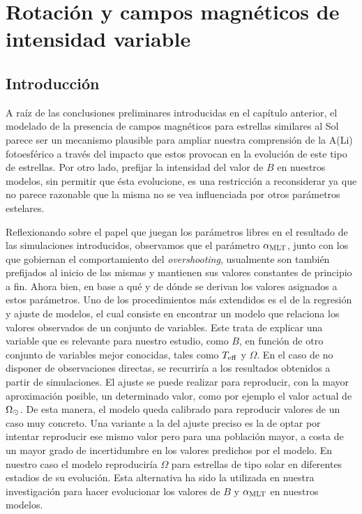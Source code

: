 

\chapter{Rotación y campos magnéticos de intensidad variable}\label{ch:septimo-capitulo}
\section{Introducción}
A raíz de las conclusiones preliminares introducidas en el capítulo anterior, el modelado de la presencia de campos magnéticos para estrellas similares al Sol parece ser un mecanismo plausible para ampliar nuestra comprensión de la A(Li) fotoesférico a través del impacto que estos provocan en la evolución de este tipo de estrellas. Por otro lado, prefijar la intensidad del valor de $B$ en nuestros modelos, sin permitir que ésta evolucione, es una restricción a reconsiderar ya que no parece razonable que la misma no se vea influenciada por otros parámetros estelares.\par

Reflexionando sobre el papel que juegan los parámetros libres en el resultado de las simulaciones introducidos, observamos que el parámetro $\alpha_{\mathrm{MLT}}$, junto con los que gobiernan el comportamiento del \textit{overshooting}, usualmente son también prefijados al inicio de las mismas y mantienen sus valores constantes de principio a fin. Ahora bien, en base a qué y de dónde se derivan los valores asignados a estos parámetros. Uno de los procedimientos más extendidos es el de la regresión y ajuste de modelos, el cual consiste en encontrar un modelo que relaciona los valores observados de un conjunto de variables. Este trata de explicar una variable que es relevante para nuestro estudio, como $B$, en función de otro conjunto de variables mejor conocidas, tales como $T_{\mathrm{eff}}$ y $\Omega$. En el caso de no disponer de observaciones directas, se recurriría a los resultados obtenidos a partir de simulaciones. El ajuste se puede realizar para reproducir, con la mayor aproximación posible, un determinado valor, como por ejemplo el valor actual de $\Omega_\odot$. De esta manera, el modelo queda calibrado para reproducir valores de un caso muy concreto. Una variante a la del ajuste preciso es la de optar por intentar reproducir ese mismo valor pero para una población mayor, a costa de un mayor grado de incertidumbre en los valores predichos por el modelo. En nuestro caso el modelo reproduciría $\Omega$ para estrellas de tipo solar en diferentes estadios de su evolución. Esta alternativa ha sido la utilizada en nuestra investigación para hacer evolucionar los valores de $B$ y $\alpha_{\mathrm{MLT}}$ en nuestros modelos.\par

